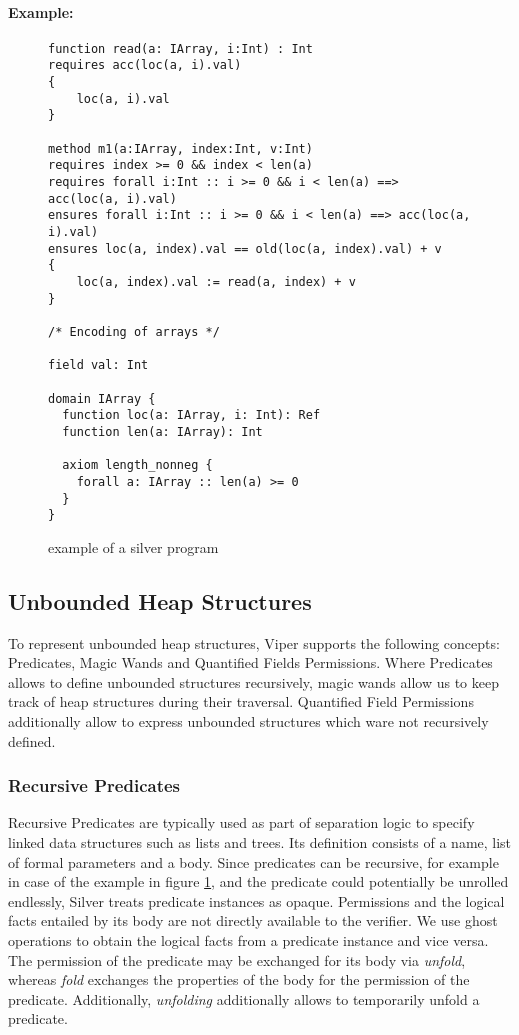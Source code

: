 \documentclass[12pt]{article}
\begin{document}
\paragraph{Example: }
\begin{figure}[h]
  \centering
\begin{lstlisting}
function read(a: IArray, i:Int) : Int
requires acc(loc(a, i).val)
{
    loc(a, i).val
}

method m1(a:IArray, index:Int, v:Int)
requires index >= 0 && index < len(a)
requires forall i:Int :: i >= 0 && i < len(a) ==> acc(loc(a, i).val)
ensures forall i:Int :: i >= 0 && i < len(a) ==> acc(loc(a, i).val)
ensures loc(a, index).val == old(loc(a, index).val) + v
{
    loc(a, index).val := read(a, index) + v
}

/* Encoding of arrays */

field val: Int

domain IArray {
  function loc(a: IArray, i: Int): Ref
  function len(a: IArray): Int

  axiom length_nonneg {
    forall a: IArray :: len(a) >= 0
  }
}
\end{lstlisting}
\caption[silver]
   {example of a silver program}
\label{rec}
\end{figure}

\subsection{Unbounded Heap Structures}
To represent unbounded heap structures, Viper supports the following concepts: Predicates, Magic Wands and Quantified Fields Permissions. Where Predicates allows to define unbounded structures recursively, magic wands allow us to keep track of heap structures during their traversal. Quantified Field Permissions additionally allow to express unbounded structures which ware not recursively defined.

\subsubsection{Recursive Predicates}

Recursive Predicates\cite{parkinson2005separation} are typically used as part of separation logic to specify linked data structures such as lists and trees. Its definition consists of a name,  list of formal parameters and a body. 
Since predicates can be recursive, for example in case of the example in figure \ref{rec}, and the predicate could potentially be unrolled endlessly, Silver treats predicate instances as opaque. Permissions and the logical facts entailed by its body are not directly available to the verifier. We use ghost operations to obtain the logical facts from a predicate instance and vice versa.
The permission of the predicate may be exchanged for its body via \textit{unfold}, whereas \textit{fold} exchanges the properties of the body for the permission of the predicate. Additionally, \textit{unfolding} additionally allows to temporarily unfold a predicate.
\end{document}
